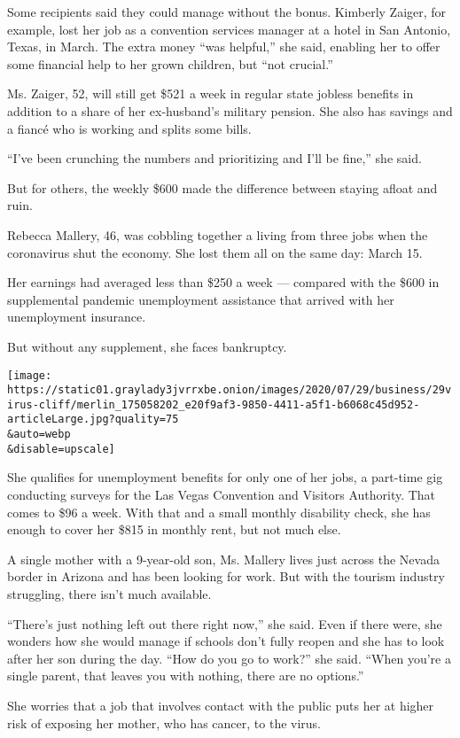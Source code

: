 Some recipients said they could manage without the bonus. Kimberly
Zaiger, for example, lost her job as a convention services manager at a
hotel in San Antonio, Texas, in March. The extra money ``was helpful,''
she said, enabling her to offer some financial help to her grown
children, but ``not crucial.''

Ms. Zaiger, 52, will still get \$521 a week in regular state jobless
benefits in addition to a share of her ex-husband's military pension.
She also has savings and a fiancé who is working and splits some bills.

``I've been crunching the numbers and prioritizing and I'll be fine,''
she said.

But for others, the weekly \$600 made the difference between staying
afloat and ruin.

Rebecca Mallery, 46, was cobbling together a living from three jobs when
the coronavirus shut the economy. She lost them all on the same day:
March 15.

Her earnings had averaged less than \$250 a week --- compared with the
\$600 in supplemental pandemic unemployment assistance that arrived with
her unemployment insurance.

But without any supplement, she faces bankruptcy.

\texttt{[image: https://static01.graylady3jvrrxbe.onion/images/2020/07/29/business/29virus-cliff/merlin\_175058202\_e20f9af3-9850-4411-a5f1-b6068c45d952-articleLarge.jpg?quality=75\\\&auto=webp\\\&disable=upscale]}

She qualifies for unemployment benefits for only one of her jobs, a
part-time gig conducting surveys for the Las Vegas Convention and
Visitors Authority. That comes to \$96 a week. With that and a small
monthly disability check, she has enough to cover her \$815 in monthly
rent, but not much else.

A single mother with a 9-year-old son, Ms. Mallery lives just across the
Nevada border in Arizona and has been looking for work. But with the
tourism industry struggling, there isn't much available.

``There's just nothing left out there right now,'' she said. Even if
there were, she wonders how she would manage if schools don't fully
reopen and she has to look after her son during the day. ``How do you go
to work?'' she said. ``When you're a single parent, that leaves you with
nothing, there are no options.''

She worries that a job that involves contact with the public puts her at
higher risk of exposing her mother, who has cancer, to the virus.

